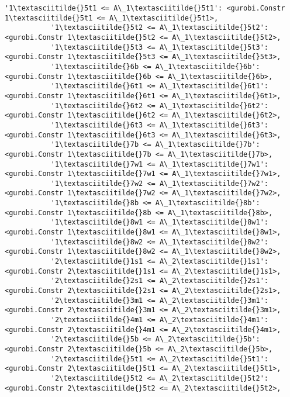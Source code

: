 \documentclass[11pt]{article}
\begin{document}
\begin{Verbatim}[commandchars=\\\{\}]
           '1\textasciitilde{}5t1 <= A\_1\textasciitilde{}5t1': <gurobi.Constr 1\textasciitilde{}5t1 <= A\_1\textasciitilde{}5t1>,
           '1\textasciitilde{}5t2 <= A\_1\textasciitilde{}5t2': <gurobi.Constr 1\textasciitilde{}5t2 <= A\_1\textasciitilde{}5t2>,
           '1\textasciitilde{}5t3 <= A\_1\textasciitilde{}5t3': <gurobi.Constr 1\textasciitilde{}5t3 <= A\_1\textasciitilde{}5t3>,
           '1\textasciitilde{}6b <= A\_1\textasciitilde{}6b': <gurobi.Constr 1\textasciitilde{}6b <= A\_1\textasciitilde{}6b>,
           '1\textasciitilde{}6t1 <= A\_1\textasciitilde{}6t1': <gurobi.Constr 1\textasciitilde{}6t1 <= A\_1\textasciitilde{}6t1>,
           '1\textasciitilde{}6t2 <= A\_1\textasciitilde{}6t2': <gurobi.Constr 1\textasciitilde{}6t2 <= A\_1\textasciitilde{}6t2>,
           '1\textasciitilde{}6t3 <= A\_1\textasciitilde{}6t3': <gurobi.Constr 1\textasciitilde{}6t3 <= A\_1\textasciitilde{}6t3>,
           '1\textasciitilde{}7b <= A\_1\textasciitilde{}7b': <gurobi.Constr 1\textasciitilde{}7b <= A\_1\textasciitilde{}7b>,
           '1\textasciitilde{}7w1 <= A\_1\textasciitilde{}7w1': <gurobi.Constr 1\textasciitilde{}7w1 <= A\_1\textasciitilde{}7w1>,
           '1\textasciitilde{}7w2 <= A\_1\textasciitilde{}7w2': <gurobi.Constr 1\textasciitilde{}7w2 <= A\_1\textasciitilde{}7w2>,
           '1\textasciitilde{}8b <= A\_1\textasciitilde{}8b': <gurobi.Constr 1\textasciitilde{}8b <= A\_1\textasciitilde{}8b>,
           '1\textasciitilde{}8w1 <= A\_1\textasciitilde{}8w1': <gurobi.Constr 1\textasciitilde{}8w1 <= A\_1\textasciitilde{}8w1>,
           '1\textasciitilde{}8w2 <= A\_1\textasciitilde{}8w2': <gurobi.Constr 1\textasciitilde{}8w2 <= A\_1\textasciitilde{}8w2>,
           '2\textasciitilde{}1s1 <= A\_2\textasciitilde{}1s1': <gurobi.Constr 2\textasciitilde{}1s1 <= A\_2\textasciitilde{}1s1>,
           '2\textasciitilde{}2s1 <= A\_2\textasciitilde{}2s1': <gurobi.Constr 2\textasciitilde{}2s1 <= A\_2\textasciitilde{}2s1>,
           '2\textasciitilde{}3m1 <= A\_2\textasciitilde{}3m1': <gurobi.Constr 2\textasciitilde{}3m1 <= A\_2\textasciitilde{}3m1>,
           '2\textasciitilde{}4m1 <= A\_2\textasciitilde{}4m1': <gurobi.Constr 2\textasciitilde{}4m1 <= A\_2\textasciitilde{}4m1>,
           '2\textasciitilde{}5b <= A\_2\textasciitilde{}5b': <gurobi.Constr 2\textasciitilde{}5b <= A\_2\textasciitilde{}5b>,
           '2\textasciitilde{}5t1 <= A\_2\textasciitilde{}5t1': <gurobi.Constr 2\textasciitilde{}5t1 <= A\_2\textasciitilde{}5t1>,
           '2\textasciitilde{}5t2 <= A\_2\textasciitilde{}5t2': <gurobi.Constr 2\textasciitilde{}5t2 <= A\_2\textasciitilde{}5t2>,

\end{Verbatim}
\end{document}
